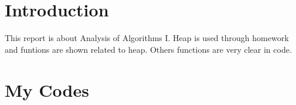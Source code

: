 \documentclass[a4paper, 12pt, titlepage]{article}
\begin{document}



\newpage

\section{Introduction}
This report is about Analysis of Algorithms I. Heap is used through homework and funtions are shown related to heap. Others functions are very clear in code.

\section{My Codes}
\end{document}
